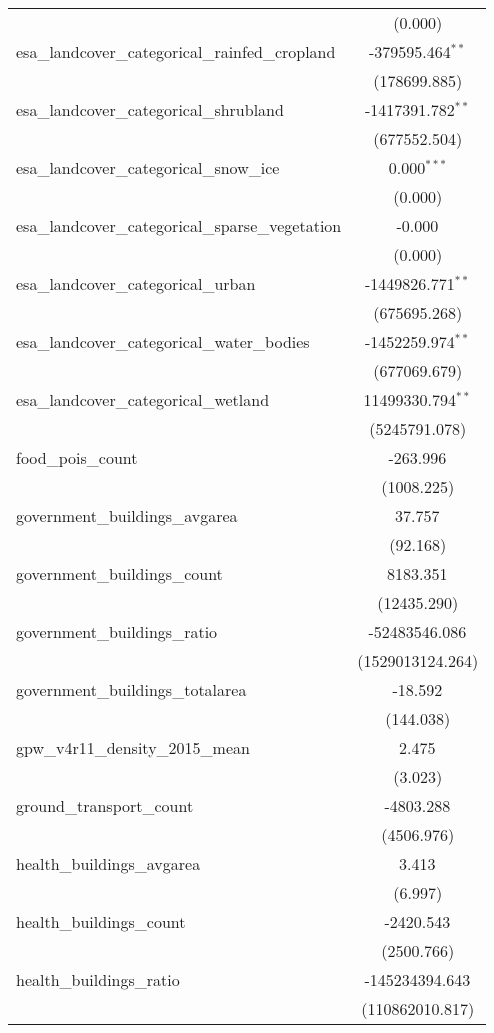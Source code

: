 \begin{table}[!htbp]
\begin{tabular}{@{\extracolsep{5pt}}lc}
  & (0.000) \\
 esa_landcover_categorical_rainfed_cropland & -379595.464$^{**}$ \\
  & (178699.885) \\
 esa_landcover_categorical_shrubland & -1417391.782$^{**}$ \\
  & (677552.504) \\
 esa_landcover_categorical_snow_ice & 0.000$^{***}$ \\
  & (0.000) \\
 esa_landcover_categorical_sparse_vegetation & -0.000$^{}$ \\
  & (0.000) \\
 esa_landcover_categorical_urban & -1449826.771$^{**}$ \\
  & (675695.268) \\
 esa_landcover_categorical_water_bodies & -1452259.974$^{**}$ \\
  & (677069.679) \\
 esa_landcover_categorical_wetland & 11499330.794$^{**}$ \\
  & (5245791.078) \\
 food_pois_count & -263.996$^{}$ \\
  & (1008.225) \\
 government_buildings_avgarea & 37.757$^{}$ \\
  & (92.168) \\
 government_buildings_count & 8183.351$^{}$ \\
  & (12435.290) \\
 government_buildings_ratio & -52483546.086$^{}$ \\
  & (1529013124.264) \\
 government_buildings_totalarea & -18.592$^{}$ \\
  & (144.038) \\
 gpw_v4r11_density_2015_mean & 2.475$^{}$ \\
  & (3.023) \\
 ground_transport_count & -4803.288$^{}$ \\
  & (4506.976) \\
 health_buildings_avgarea & 3.413$^{}$ \\
  & (6.997) \\
 health_buildings_count & -2420.543$^{}$ \\
  & (2500.766) \\
 health_buildings_ratio & -145234394.643$^{}$ \\
  & (110862010.817) \\

\end{tabular}
\end{table}
